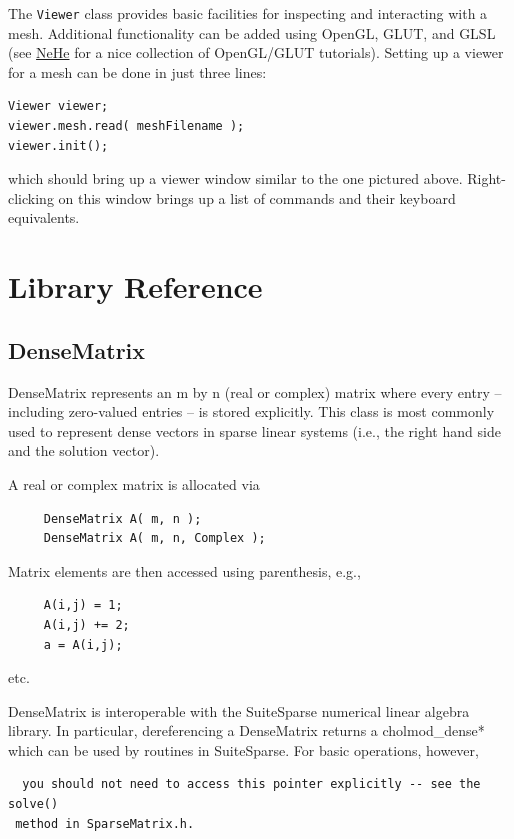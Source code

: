 \documentclass{article}
\begin{document}
The \texttt{Viewer} class provides basic facilities for inspecting and interacting with a mesh.  Additional functionality can be added using OpenGL, GLUT, and GLSL (see \href{http://nehe.gamedev.net/}{NeHe} for a nice collection of OpenGL/GLUT tutorials).  Setting up a viewer for a mesh can be done in just three lines:

\begin{verbatim}
Viewer viewer;
viewer.mesh.read( meshFilename );
viewer.init();
\end{verbatim}

which should bring up a viewer window similar to the one pictured above.  Right-clicking on this window brings up a list of commands and their keyboard equivalents.

\pagebreak
\section{Library Reference}
\label{sec:libref}

\addtolength{\parskip}{-\baselineskip}

\subsection{DenseMatrix}

DenseMatrix represents an m by n (real or complex) matrix where every entry -- including zero-valued entries -- is stored explicitly.  This class is most commonly used to represent dense vectors in sparse linear systems (i.e., the right hand side and the solution vector). 

 A real or complex matrix is allocated via 

 \begin{verbatim}
     DenseMatrix A( m, n );
     DenseMatrix A( m, n, Complex );
 \end{verbatim}
\vspace{-\baselineskip} Matrix elements are then accessed using parenthesis, e.g., 

 \begin{verbatim}
     A(i,j) = 1;
     A(i,j) += 2;
     a = A(i,j);
 \end{verbatim}
\vspace{-\baselineskip} etc. 

 DenseMatrix is interoperable with the SuiteSparse numerical linear algebra library.  In particular, dereferencing a DenseMatrix returns a cholmod\_dense* which can be used by routines in SuiteSparse.  For basic operations, however, \begin{verbatim}
  you should not need to access this pointer explicitly -- see the solve()
 method in SparseMatrix.h.\end{verbatim}
\vspace{-\baselineskip} 
\end{document}
